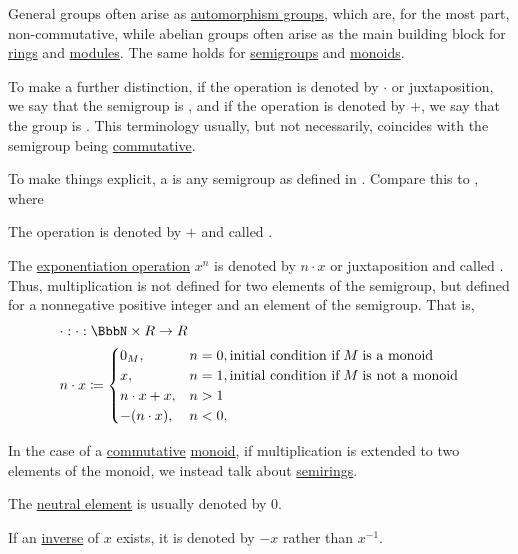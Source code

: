 \begin{remark}\label{rem:additive_semigroup}
  General groups often arise as \hyperref[def:automorphism_group]{automorphism groups}, which are, for the most part, non-commutative, while abelian groups often arise as the main building block for \hyperref[def:ring]{rings} and \hyperref[def:module]{modules}. The same holds for \hyperref[def:semigroup]{semigroups} and \hyperref[def:monoid]{monoids}.

  To make a further distinction, if the operation is denoted by \( \cdot \) or juxtaposition, we say that the semigroup is , and if the operation is denoted by \( + \), we say that the group is . This terminology usually, but not necessarily, coincides with the semigroup being \hyperref[def:binary_operation/commutative]{commutative}.

  To make things explicit, a  is any semigroup as defined in . Compare this to , where
  \begin{thmenum}
     The operation is denoted by \( + \) and called .

     The \hyperref[def:semigroup/exponentiation]{exponentiation operation} \( x^n \) is denoted by \( n \cdot x \) or juxtaposition and called . Thus, multiplication is not defined for two elements of the semigroup, but defined for a nonnegative positive integer and an element of the semigroup. That is,
    \begin{equation}\label{eq:rem:additive_semigroup/multiplication}
      \begin{aligned}
        &\cdot: \cdot: \BbbN \times R \to R \\
        &n \cdot x \coloneqq \begin{cases}
          0_M,           &n = 0, \T{initial condition if} M \T{is a monoid} \\
          x,             &n = 1, \T{initial condition if} M \T{is not a monoid} \\
          n \cdot x + x, &n > 1 \\
          -(n \cdot x),  &n < 0, \\
        \end{cases}
      \end{aligned}
    \end{equation}

    In the case of a \hyperref[def:binary_operation/commutative]{commutative} \hyperref[def:monoid]{monoid}, if multiplication is extended to two elements of the monoid, we instead talk about \hyperref[def:semiring]{semirings}.

     The \hyperref[def:monoid]{neutral element} is usually denoted by \( 0 \).

     If an \hyperref[def:monoid_inverse]{inverse} of \( x \) exists, it is denoted by \( -x \) rather than \( x^{-1} \).
  \end{thmenum}
\end{remark}

